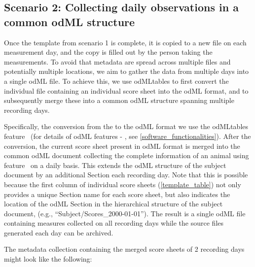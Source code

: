 \subsection*{Scenario 2: Collecting daily observations in a common odML structure}

Once the template from scenario 1 is complete, it is copied to a new file on each measurement day, and the copy is filled out by the person taking the measurements. To avoid that metadata are spread across multiple files and potentially multiple locations, we aim to gather the data from multiple days into a single odML file. To achieve this, we use odMLtables to first convert the individual  file containing an individual score sheet into the odML format, and to subsequently merge these into a common odML structure spanning multiple recording days.

Specifically, the conversion from the  to the odML format we use the odMLtables feature \fconvert\ (for details of odML features \fconvert - \ffilter, see \cref{software_functionalities}). After the conversion, the current score sheet present in odML format is merged into the common odML document collecting the complete information of an animal using feature \fmerge \ on a daily basis. This extends the odML structure of the subject document by an additional Section each recording day. Note that this is possible because the first column of individual score sheets (\cref{template_table}) not only provides a unique Section name for each score sheet, but also indicates the location of the odML Section in the hierarchical structure of the subject document, (e.g., ``Subject/Scores\_2000-01-01''). The result is a single odML file containing measures collected on all recording days while the source files generated each day can be archived.

The metadata collection containing the merged score sheets of 2 recording days might look like the following:

\begin{minipage}[t]{\textwidth}
\ \\
\end{minipage}

